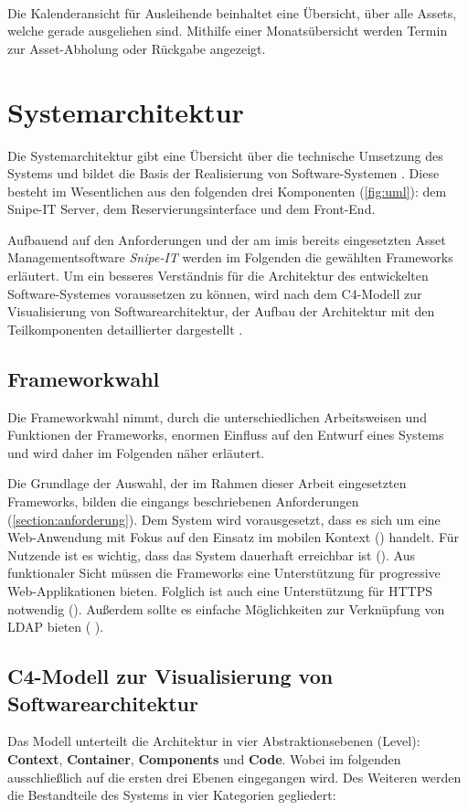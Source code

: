 {\sffamily\color{maincolor}{Ft-B-4 | Kalenderansicht für Ausleihende}}\\
Die Kalenderansicht für Ausleihende beinhaltet eine Übersicht, über alle Assets, welche gerade
ausgeliehen sind. Mithilfe einer Monatsübersicht werden Termin zur Asset-Abholung oder Rückgabe
angezeigt. 


\section{Systemarchitektur}
Die Systemarchitektur gibt eine Übersicht über die technische Umsetzung des Systems und
bildet die Basis der Realisierung von Software-Systemen . Diese besteht im
Wesentlichen aus den folgenden drei Komponenten (\ref{fig:uml}): dem Snipe-IT Server, dem
Reservierungsinterface und dem Front-End.

Aufbauend auf den Anforderungen und der am \ac{imis} bereits eingesetzten Asset Managementsoftware
\textit{Snipe-IT} werden im Folgenden die gewählten Frameworks erläutert. Um ein besseres
Verständnis für die Architektur des entwickelten Software-Systemes voraussetzen zu können, wird nach
dem C4-Modell zur Visualisierung von Softwarearchitektur, der Aufbau der Architektur mit den
Teilkomponenten detaillierter dargestellt . 

\subsection{Frameworkwahl}
Die Frameworkwahl nimmt, durch die unterschiedlichen Arbeitsweisen und Funktionen der Frameworks,
enormen Einfluss auf den Entwurf eines Systems und wird daher im Folgenden näher erläutert. 
 
Die Grundlage der Auswahl, der im Rahmen dieser Arbeit eingesetzten Frameworks, bilden die eingangs
beschriebenen Anforderungen (\ref{section:anforderung}). Dem System wird vorausgesetzt, dass es sich
um eine Web-Anwendung mit Fokus auf den Einsatz im mobilen Kontext () handelt. Für
Nutzende ist es wichtig, dass das System dauerhaft erreichbar ist (). Aus funktionaler
Sicht müssen die Frameworks eine Unterstützung für progressive Web-Applikationen bieten. Folglich
ist auch eine Unterstützung für HTTPS notwendig (). Außerdem sollte es einfache
Möglichkeiten zur Verknüpfung von LDAP bieten ( ).


\subsection{C4-Modell zur Visualisierung von Softwarearchitektur}
Das Modell unterteilt die Architektur in vier Abstraktionsebenen (Level): \textbf{Context},
\textbf{Container}, \textbf{Components} und \textbf{Code}. Wobei im folgenden ausschließlich
auf die ersten drei Ebenen eingegangen wird. Des Weiteren werden die Bestandteile des
Systems in vier Kategorien gegliedert:

